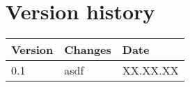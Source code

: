 \chapter{Version history}
\label{chap:report-versions}

\begin{tabular}{|m{}|m{}|m{}|}
 \hline
 \textbf{Version} & \textbf{Changes} & \textbf{Date} \\ [0.5ex]
 \hline
 0.1 & asdf & XX.XX.XX  \\
 \hline
\end{tabular}